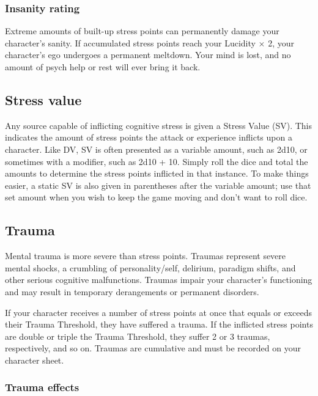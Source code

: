 \subsubsection{Insanity rating}

Extreme amounts of built-up stress points can permanently damage your character’s sanity. If accumulated stress points reach your Lucidity $\times$ 2, your character’s ego undergoes a permanent meltdown. Your mind is lost, and no amount of psych help or rest will ever bring it back.


\subsection{Stress value}
\label{sec:stress-value}

Any source capable of inflicting cognitive stress is given a Stress Value (SV). This indicates the amount of stress points the attack or experience inflicts upon a character. Like DV, SV is often presented as a variable amount, such as 2d10, or sometimes with a modifier, such as 2d10 + 10. Simply roll the dice and total the amounts to determine the stress points inflicted in that instance. To make things easier, a static SV is also given in parentheses after the variable amount; use that set amount when you wish to keep the game moving and don’t want to roll dice.


\subsection{Trauma}
\label{sec:trauma}

Mental trauma is more severe than stress points. Traumas represent severe mental shocks, a crumbling of personality/self, delirium, paradigm shifts, and other serious cognitive malfunctions. Traumas impair your character’s functioning and may result in temporary derangements or permanent disorders.

If your character receives a number of stress points at once that equals or exceeds their Trauma Threshold, they have suffered a trauma. If the inflicted stress points are double or triple the Trauma Threshold, they suffer 2 or 3 traumas, respectively, and so on. Traumas are cumulative and must be recorded on your character sheet.

\subsubsection{Trauma effects}

